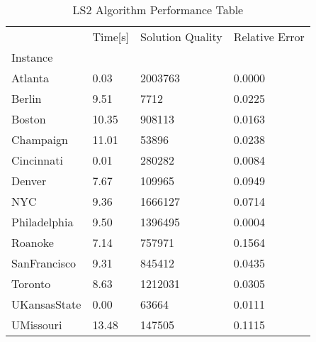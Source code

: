 \begin{table} [H]
\caption{ LS2 Algorithm Performance Table }
\begin{tabular}{llll}
\toprule
{} & Time[s] & Solution Quality & Relative Error \\
Instance     &         &                  &                \\
\midrule
Atlanta      &    0.03 &          2003763 &         0.0000 \\
Berlin       &    9.51 &             7712 &         0.0225 \\
Boston       &   10.35 &           908113 &         0.0163 \\
Champaign    &   11.01 &            53896 &         0.0238 \\
Cincinnati   &    0.01 &           280282 &         0.0084 \\
Denver       &    7.67 &           109965 &         0.0949 \\
NYC          &    9.36 &          1666127 &         0.0714 \\
Philadelphia &    9.50 &          1396495 &         0.0004 \\
Roanoke      &    7.14 &           757971 &         0.1564 \\
SanFrancisco &    9.31 &           845412 &         0.0435 \\
Toronto      &    8.63 &          1212031 &         0.0305 \\
UKansasState &    0.00 &            63664 &         0.0111 \\
UMissouri    &   13.48 &           147505 &         0.1115 \\
\bottomrule
\end{tabular}
\end{table}

